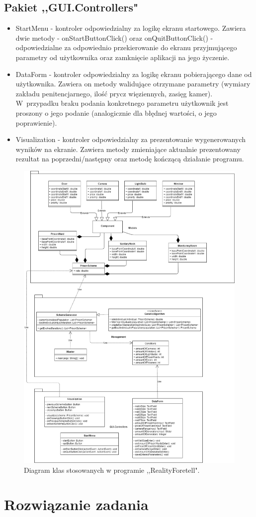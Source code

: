 \documentclass[10pt,oneside]{article}
\begin{document}
	\subsection{Pakiet ,,GUI.Controllers"}
	\begin{itemize}
		\item StartMenu - kontroler odpowiedzialny za logikę ekranu startowego. Zawiera dwie metody - onStartButtonClick() oraz onQuitButtonClick() - odpowiedzialne za odpowiednio przekierowanie do ekranu przyjmującego parametry od użytkownika oraz zamknięcie aplikacji na jego życzenie.
		\item DataForm - kontroler odpowiedzialny za logikę ekranu pobierającego dane od użytkownika. Zawiera on metody walidujące otrzymane parametry (wymiary zakładu penitencjarnego, ilość prycz więziennych, zasięg kamer). W~przypadku braku podania konkretnego parametru użytkownik jest proszony o jego podanie (analogicznie dla błędnej wartości, o jego poprawienie).
		\item Visualization - kontroler odpowiedzialny za prezentowanie wygenerowanych wyników na ekranie. Zawiera metody zmieniające aktualnie prezentowany rezultat na poprzedni/następny oraz metodę kończącą działanie programu.
	\end{itemize}
	\begin{figure}[!ht]
		\includegraphics[width=0.9\columnwidth]{Class_diagram_Reality_Foretell.png}
		\caption{Diagram klas stosowanych w programie ,,RealityForetell".}
	\end{figure}
	
	\section{Rozwiązanie zadania}
	
\end{document}
